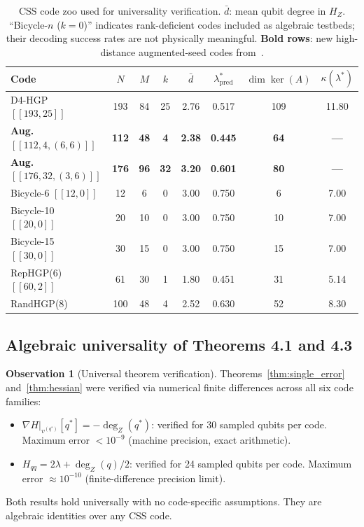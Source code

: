 \documentclass[12pt,a4paper]{article}
\theoremstyle{plain}
\theoremstyle{definition}
\newtheorem{observation}[theorem]{Observation}
\theoremstyle{remark}
\newcommand{\HZ}{H_Z}
\newcommand{\dZ}{\operatorname{deg}_Z}
\begin{document}
\begin{table}[ht]
\centering
\caption{CSS code zoo used for universality verification.
  $\bar{d}$: mean qubit degree in $\HZ$.
  ``Bicycle-$n$ ($k=0$)'' indicates rank-deficient codes included as
  algebraic testbeds; their decoding success rates are not physically
  meaningful.
  \textbf{Bold rows}: new high-distance augmented-seed codes from~\cite{SchmittScale}.}
\label{tab:zoo}
\small
\begin{tabular}{lccccccc}
\toprule
Code & $N$ & $M$ & $k$ & $\bar{d}$ & $\lambda^*_{\mathrm{pred}}$ & $\dim\ker(A)$ & $\kappa(\lambda^*)$ \\
\midrule
D4-HGP $[[193,25]]$ & 193 & 84 & 25 & 2.76 & 0.517 & 109 & 11.80 \\
\textbf{Aug. $[[112,4,(6,6)]]$} & \textbf{112} & \textbf{48} & \textbf{4} & \textbf{2.38} & \textbf{0.445} & \textbf{64} & \textbf{---} \\
\textbf{Aug. $[[176,32,(3,6)]]$} & \textbf{176} & \textbf{96} & \textbf{32} & \textbf{3.20} & \textbf{0.601} & \textbf{80} & \textbf{---} \\
Bicycle-6 $[[12,0]]$ & 12 & 6 & 0 & 3.00 & 0.750 & 6 & 7.00 \\
Bicycle-10 $[[20,0]]$ & 20 & 10 & 0 & 3.00 & 0.750 & 10 & 7.00 \\
Bicycle-15 $[[30,0]]$ & 30 & 15 & 0 & 3.00 & 0.750 & 15 & 7.00 \\
RepHGP(6) $[[60,2]]$ & 61 & 30 & 1 & 1.80 & 0.451 & 31 & 5.14 \\
RandHGP(8) & 100 & 48 & 4 & 2.52 & 0.630 & 52 & 8.30 \\
\bottomrule
\end{tabular}
\end{table}

\subsection{Algebraic universality of Theorems 4.1 and 4.3}

\begin{observation}[Universal theorem verification]\label{obs:universal}
Theorems~\ref{thm:single_error} and~\ref{thm:hessian} were verified via
numerical finite differences across all six code families:
\begin{itemize}[noitemsep]
\item $\nabla H|_{v^{(q^*)}}[q^*] = -\dZ(q^*)$:
  verified for 30 sampled qubits per code.
  Maximum error $< 10^{-9}$ (machine precision, exact arithmetic).
\item $H_{qq} = 2\lambda + \dZ(q)/2$:
  verified for 24 sampled qubits per code.
  Maximum error $\approx 10^{-10}$ (finite-difference precision limit).
\end{itemize}
Both results hold universally with no code-specific assumptions.
They are algebraic identities over any CSS code.
\end{observation}
\end{document}
